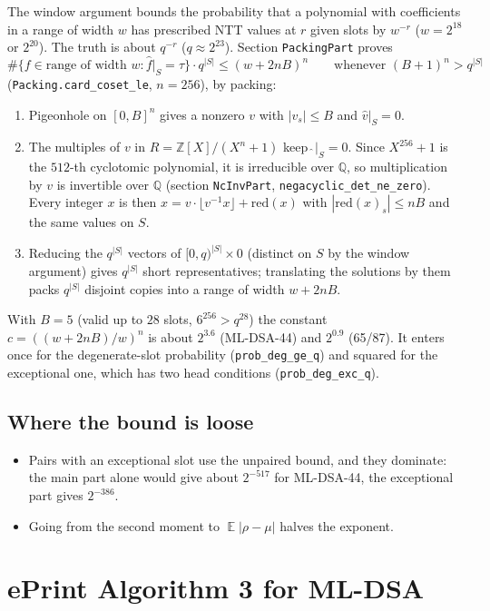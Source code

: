 \documentclass[11pt]{article}
\theoremstyle{definition}
\theoremstyle{remark}
\newcommand{\Z}{\mathbb{Z}}
\newcommand{\lean}[1]{\texttt{#1}}
\begin{document}
The window argument bounds the probability that a polynomial with coefficients in a range of
width $w$ has prescribed NTT values at $r$ given slots by $w^{-r}$ ($w = 2^{18}$ or $2^{20}$). The
truth is about $q^{-r}$ ($q \approx 2^{23}$). Section \lean{PackingPart} proves
\[
  \#\{f \in \text{range of width } w : \hat f|_S = \tau\} \cdot q^{|S|} \le (w + 2nB)^n
  \qquad\text{whenever } (B+1)^n > q^{|S|}
\]
(\lean{Packing.card\_coset\_le}, $n = 256$), by packing:
\begin{enumerate}
\item Pigeonhole on $[0,B]^n$ gives a nonzero $v$ with $|v_s| \le B$ and $\hat v|_S = 0$.
\item The multiples of $v$ in $R = \Z[X]/(X^n+1)$ keep $\hat{\ }|_S = 0$. Since $X^{256}+1$ is the
  $512$-th cyclotomic polynomial, it is irreducible over $\mathbb Q$, so multiplication by $v$ is
  invertible over $\mathbb Q$ (section \lean{NcInvPart}, \lean{negacyclic\_det\_ne\_zero}).
  Every integer $x$ is then $x = v\cdot\lfloor v^{-1}x\rfloor + \mathrm{red}(x)$ with
  $|\mathrm{red}(x)_s| \le nB$ and the same values on $S$.
\item Reducing the $q^{|S|}$ vectors of $[0,q)^{|S|}\times 0$ (distinct on $S$ by the window
  argument) gives $q^{|S|}$ short representatives; translating the solutions by them packs
  $q^{|S|}$ disjoint copies into a range of width $w + 2nB$.
\end{enumerate}
With $B = 5$ (valid up to $28$ slots, $6^{256} > q^{28}$) the constant $c = ((w+2nB)/w)^n$ is
about $2^{3.6}$ (ML-DSA-44) and $2^{0.9}$ (65/87). It enters once for the degenerate-slot
probability (\lean{prob\_deg\_ge\_q}) and squared for the exceptional one, which has two head
conditions (\lean{prob\_deg\_exc\_q}).

\subsection{Where the bound is loose}

\begin{itemize}
\item Pairs with an exceptional slot use the unpaired bound, and they dominate: the main part
  alone would give about $2^{-517}$ for ML-DSA-44, the exceptional part gives $2^{-386}$.
\item Going from the second moment to $\mathop{\mathbb E}|\rho - \mu|$ halves the exponent.
\end{itemize}

\section{ePrint Algorithm 3 for ML-DSA}\label{sec:alg3}
\end{document}
